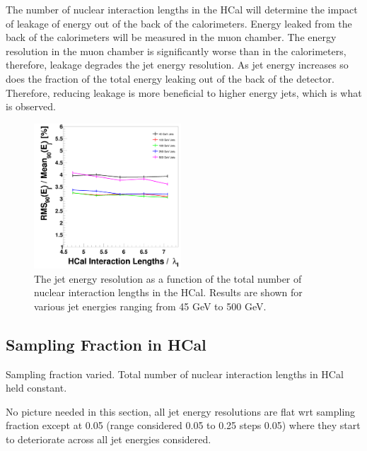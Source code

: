\documentclass[final,3p,times,twocolumn]{elsarticle}
\begin{document}
The number of nuclear interaction lengths in the HCal will determine the impact of leakage of energy out of the back of the calorimeters.  Energy leaked from the back of the calorimeters will be measured in the muon chamber.  The energy resolution in the muon chamber is significantly worse than in the calorimeters, therefore, leakage degrades the jet energy resolution.  As jet energy increases so does the fraction of the total energy leaking out of the back of the detector.  Therefore, reducing leakage is more beneficial to higher energy jets, which is what is observed.

\begin{figure}[!h]
  \begin{center}
     \includegraphics[width=0.49\textwidth]{JERvsHCalIntLengthHCalTC10ns.png}
     \caption{The jet energy resolution as a function of the total number of nuclear interaction lengths in the HCal.  Results are shown for various jet energies ranging from 45 GeV to 500 GeV.\label{HCalDepth}}
  \end{center}
\end{figure}

\subsection{Sampling Fraction in HCal}


Sampling fraction varied.  Total number of nuclear interaction lengths in HCal held constant. 

No picture needed in this section, all jet energy resolutions are flat wrt sampling fraction except at 0.05 (range considered 0.05 to 0.25 steps 0.05) where they start to 
deteriorate across all jet energies considered.  

\end{document}
